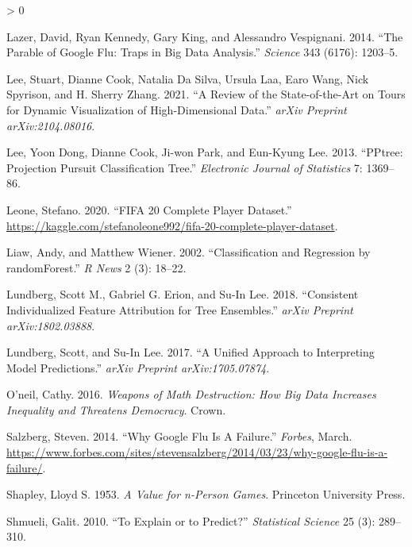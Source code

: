 \documentclass[
]{article}
\newlength{\cslhangindent}
\newenvironment{CSLReferences}[2] %
 {%
  \setlength{\parindent}{0pt}
  \ifodd #1 \everypar{\setlength{\hangindent}{\cslhangindent}}\ignorespaces\fi
  \ifnum #2 > 0
  \setlength{\parskip}{#2\baselineskip}
  \fi
 }%
 {}
\begin{document}
\begin{CSLReferences}{1}{0}
\leavevmode\hypertarget{ref-lazer_parable_2014}{}%
Lazer, David, Ryan Kennedy, Gary King, and Alessandro Vespignani. 2014. {``The Parable of {Google} {Flu}: Traps in Big Data Analysis.''} \emph{Science} 343 (6176): 1203--5.

\leavevmode\hypertarget{ref-lee_review_2021}{}%
Lee, Stuart, Dianne Cook, Natalia Da Silva, Ursula Laa, Earo Wang, Nick Spyrison, and H. Sherry Zhang. 2021. {``A {Review} of the {State}-of-the-{Art} on {Tours} for {Dynamic} {Visualization} of {High}-Dimensional {Data}.''} \emph{arXiv Preprint arXiv:2104.08016}.

\leavevmode\hypertarget{ref-lee_pptree_2013}{}%
Lee, Yoon Dong, Dianne Cook, Ji-won Park, and Eun-Kyung Lee. 2013. {``{PPtree}: {Projection} Pursuit Classification Tree.''} \emph{Electronic Journal of Statistics} 7: 1369--86.

\leavevmode\hypertarget{ref-leone_fifa_2020}{}%
Leone, Stefano. 2020. {``{FIFA} 20 Complete Player Dataset.''} \url{https://kaggle.com/stefanoleone992/fifa-20-complete-player-dataset}.

\leavevmode\hypertarget{ref-liaw_classification_2002}{}%
Liaw, Andy, and Matthew Wiener. 2002. {``Classification and Regression by {randomForest}.''} \emph{R News} 2 (3): 18--22.

\leavevmode\hypertarget{ref-lundberg_consistent_2018}{}%
Lundberg, Scott M., Gabriel G. Erion, and Su-In Lee. 2018. {``Consistent Individualized Feature Attribution for Tree Ensembles.''} \emph{arXiv Preprint arXiv:1802.03888}.

\leavevmode\hypertarget{ref-lundberg_unified_2017}{}%
Lundberg, Scott, and Su-In Lee. 2017. {``A Unified Approach to Interpreting Model Predictions.''} \emph{arXiv Preprint arXiv:1705.07874}.

\leavevmode\hypertarget{ref-oneil_weapons_2016}{}%
O'neil, Cathy. 2016. \emph{Weapons of Math Destruction: {How} Big Data Increases Inequality and Threatens Democracy}. Crown.

\leavevmode\hypertarget{ref-salzberg_why_2014}{}%
Salzberg, Steven. 2014. {``Why {Google} {Flu} {Is} {A} {Failure}.''} \emph{Forbes}, March. \url{https://www.forbes.com/sites/stevensalzberg/2014/03/23/why-google-flu-is-a-failure/}.

\leavevmode\hypertarget{ref-shapley_value_1953}{}%
Shapley, Lloyd S. 1953. \emph{A Value for n-Person Games}. Princeton University Press.

\leavevmode\hypertarget{ref-shmueli_explain_2010}{}%
Shmueli, Galit. 2010. {``To Explain or to Predict?''} \emph{Statistical Science} 25 (3): 289--310.


\end{CSLReferences}
\end{document}
